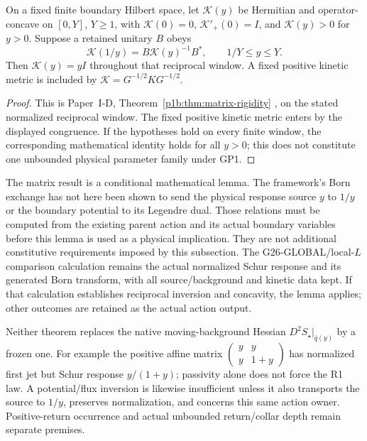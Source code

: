 \documentclass[11pt,a4paper]{article}
\begin{document}
\begin{theorem}
\label{p3f:thm:v203-matrix-reciprocal-rigidity}
On a fixed finite boundary Hilbert space, let $\mathcal K(y)$ be Hermitian
and operator-concave on $[0,Y]$, $Y\ge1$, with
$\mathcal K(0)=0$, $\mathcal K'_+(0)=I$, and $\mathcal K(y)>0$ for $y>0$.
Suppose a retained unitary $B$ obeys
\[
 \mathcal K(1/y)=B\mathcal K(y)^{-1}B^*,\qquad 1/Y\le y\le Y.
\]
Then $\mathcal K(y)=yI$ throughout that reciprocal window. A fixed positive
kinetic metric is included by $\mathcal K=G^{-1/2}KG^{-1/2}$.
\end{theorem}
\begin{proof}
This is Paper~I-D, Theorem~\ref{p1b:thm:matrix-rigidity}
\cite{Kugelmann2026Paper1D}, on the stated normalized reciprocal window.
The fixed positive kinetic metric enters by the displayed congruence.
If the hypotheses hold on every finite window, the corresponding
mathematical identity holds for all \(y>0\); this does not constitute
one unbounded physical parameter family under GP1.
\end{proof}

The matrix result is a conditional mathematical lemma. The framework's
Born exchange has not here been shown to send the physical response source
$y$ to $1/y$ or the boundary potential to its Legendre dual. Those relations
must be computed from the existing parent action and its actual boundary
variables before this lemma is used as a physical implication. They are
not additional constitutive requirements imposed by this subsection.
The G26-GLOBAL/local-\(L\) comparison calculation remains the actual normalized Schur response and its
generated Born transform, with all source/background and kinetic data kept.
If that calculation establishes reciprocal inversion and concavity, the
lemma applies; other outcomes are retained as the actual action output.

Neither theorem replaces the native moving-background Hessian
\(D^2S_\star|_{\bar q(y)}\) by a frozen one.  For example the positive affine
matrix \(\left(\begin{smallmatrix}y&y\\y&1+y\end{smallmatrix}\right)\)
has normalized first jet but Schur response \(y/(1+y)\); passivity alone
does not force the R1 law.  A potential/flux inversion is likewise insufficient
unless it also transports the source to \(1/y\), preserves normalization,
and concerns this same action owner.  Positive-return occurrence and actual
unbounded return/collar depth remain separate premises.
\end{document}

